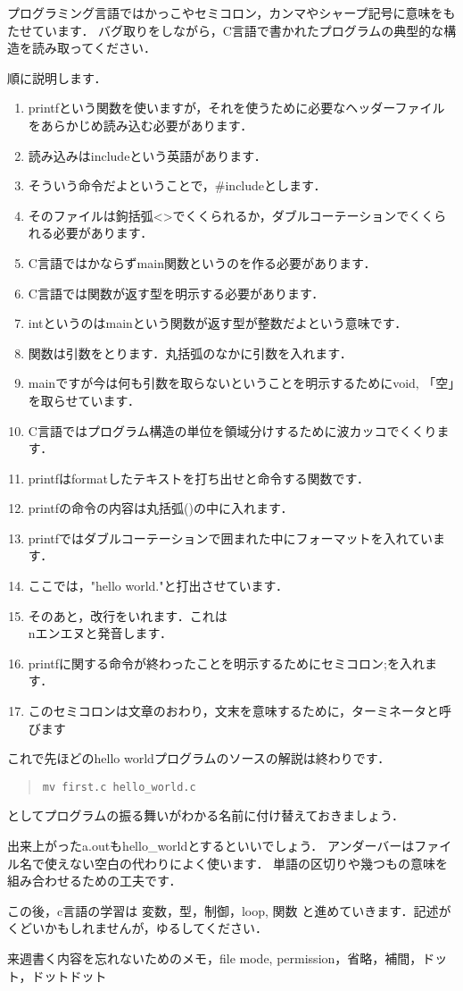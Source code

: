 \documentclass[12pt,a4paper]{jsarticle}
\begin{document}
プログラミング言語ではかっこやセミコロン，カンマやシャープ記号に意味をもたせています．
バグ取りをしながら，C言語で書かれたプログラムの典型的な構造を読み取ってください．

順に説明します．

\begin{enumerate}
\item printfという関数を使いますが，それを使うために必要なヘッダーファイルをあらかじめ読み込む必要があります．
\item 読み込みはincludeという英語があります．
\item そういう命令だよということで，\#includeとします．
\item そのファイルは鉤括弧<>でくくられるか，ダブルコーテーションでくくられる必要があります．
\item C言語ではかならずmain関数というのを作る必要があります．
\item C言語では関数が返す型を明示する必要があります．
\item intというのはmainという関数が返す型が整数だよという意味です．
\item 関数は引数をとります．丸括弧のなかに引数を入れます．
\item mainですが今は何も引数を取らないということを明示するためにvoid, 「空」を取らせています．
\item C言語ではプログラム構造の単位を領域分けするために波カッコ{}でくくります．
\item printfはformatしたテキストを打ち出せと命令する関数です．
\item printfの命令の内容は丸括弧()の中に入れます．
\item printfではダブルコーテーションで囲まれた中にフォーマットを入れています．
\item ここでは，"hello world."と打出させています．
\item そのあと，改行をいれます．これは\\nエンエヌと発音します．
\item printfに関する命令が終わったことを明示するためにセミコロン;を入れます．
\item このセミコロンは文章のおわり，文末を意味するために，ターミネータと呼びます
\end{enumerate}
これで先ほどのhello worldプログラムのソースの解説は終わりです．
\begin{quote}\begin{verbatim}
mv first.c hello_world.c
\end{verbatim}\end{quote}
としてプログラムの振る舞いがわかる名前に付け替えておきましょう．

出来上がったa.outもhello\_worldとするといいでしょう．
アンダーバーはファイル名で使えない空白の代わりによく使います．
単語の区切りや幾つもの意味を組み合わせるための工夫です．

この後，c言語の学習は
変数，型，制御，loop, 関数
と進めていきます．記述がくどいかもしれませんが，ゆるしてください．

来週書く内容を忘れないためのメモ，file mode, permission，省略，補間，ドット，ドットドット
\end{document}
